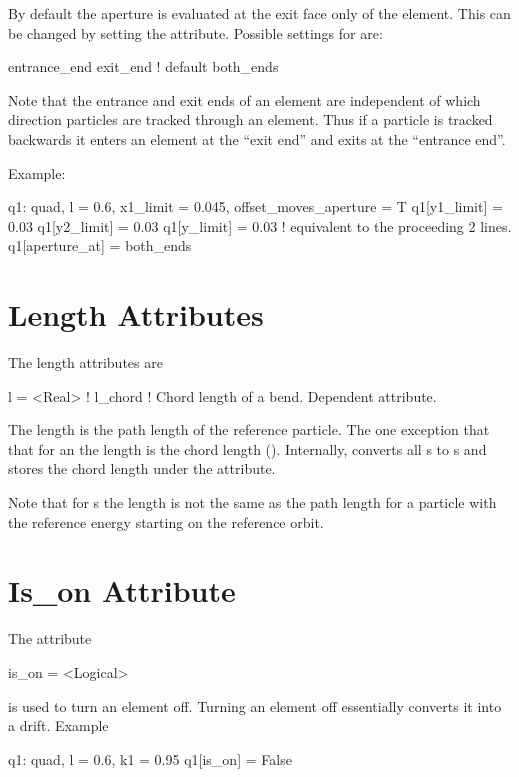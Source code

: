 By default the aperture is evaluated at the exit face only of the
element. This can be changed by setting the  attribute.
Possible settings for  are:
\begin{example}
  entrance_end
  exit_end  ! default
  both_ends
\end{example}
Note that the entrance and exit ends of an element are independent of
which direction particles are tracked through an element. Thus if a
particle is tracked backwards it enters an element at the ``exit end''
and exits at the ``entrance end''.

Example:
\begin{example}
  q1: quad, l = 0.6, x1_limit = 0.045, offset_moves_aperture = T
  q1[y1_limit] = 0.03
  q1[y2_limit] = 0.03
  q1[y_limit] = 0.03  ! equivalent to the proceeding 2 lines.  
  q1[aperture_at] = both_ends
\end{example}

\section{Length Attributes}
\label{s:l}

The length attributes are
\begin{example}
  l       = <Real>  ! 
  l_chord           ! Chord length of a bend. Dependent attribute.
\end{example}
The length  is the path length of the reference
particle. The one exception that that for an  the length
 is the chord length (). Internally, \bmad converts
all s to s and stores the chord length
under the  attribute.

Note that for s
the length  is not the same as the path length for a particle
with the reference energy starting on the reference orbit.

\section{Is_on Attribute}
\label{s:is.on}

The  attribute
\begin{example}
  is_on = <Logical>
\end{example}
is used to turn an element off. Turning
an element off essentially converts it into a drift.
Example
\begin{example}
  q1: quad, l = 0.6, k1 = 0.95
  q1[is_on] = False
\end{example}

